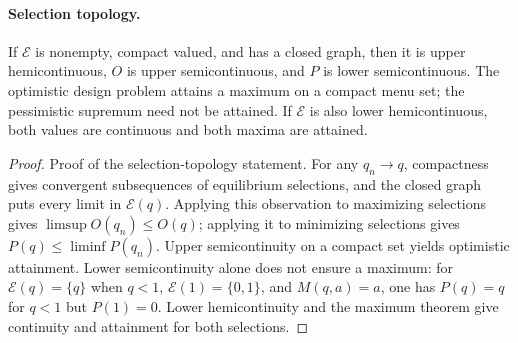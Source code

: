 \documentclass[mnsc,blindrev]{informs3}
\newcommand{\calE}{\mathcal E}
\begin{document}
\paragraph{Selection topology.}
If $\calE$ is nonempty, compact valued, and has a closed graph, then it is
upper hemicontinuous, $O$ is upper semicontinuous, and $P$ is lower
semicontinuous.  The optimistic design problem attains a maximum on a compact
menu set; the pessimistic supremum need not be attained.  If $\calE$ is also
lower hemicontinuous, both values are continuous and both maxima are attained.

\begin{proof}{Proof of the selection-topology statement.}
For any $q_n\to q$, compactness gives convergent subsequences of equilibrium
selections, and the closed graph puts every limit in $\calE(q)$.  Applying
this observation to maximizing selections gives
$\limsup O(q_n)\le O(q)$; applying it to minimizing selections gives
$P(q)\le\liminf P(q_n)$.  Upper semicontinuity on a compact set yields
optimistic attainment.  Lower semicontinuity alone does not ensure a maximum:
for $\calE(q)=\{q\}$ when $q<1$, $\calE(1)=\{0,1\}$, and $M(q,a)=a$, one has
$P(q)=q$ for $q<1$ but $P(1)=0$.  Lower hemicontinuity and the maximum theorem
give continuity and attainment for both selections.
\Halmos\end{proof}
\end{document}
